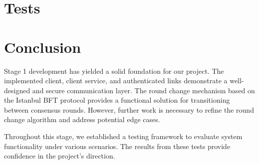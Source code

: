 \documentclass[12pt]{article}
\begin{document}
\section{Tests}

\section{Conclusion}

Stage 1 development has yielded a solid foundation for our project. The implemented client, client service, and authenticated links demonstrate a well-designed and secure communication layer. The round change mechanism based on the Istanbul BFT protocol provides a functional solution for transitioning between consensus rounds. However, further work is necessary to refine the round change algorithm and address potential edge cases.

Throughout this stage, we established a testing framework to evaluate system functionality under various scenarios. The results from these tests provide confidence in the project's direction.

\label{LastPage}
\end{document}
